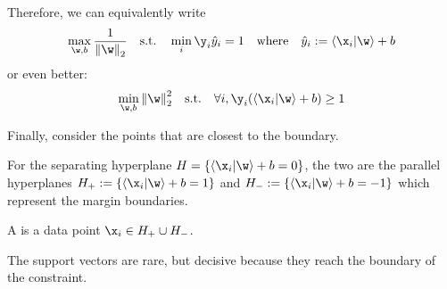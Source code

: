 \documentclass[class=cs480,notes,tikz]{agony}
\begin{document}
Therefore, we can equivalently write
\[ \max_{\w,b} \frac{1}{\norm{\w}_2} \qq{s.t.} \min_i \y_i \hat y_i = 1 \qq{where} \hat y_i := \ip{\x_i}{\w} + b \]
or even better:
\begin{equation}\label{eq:hsvm}
  \min_{\w,b} \norm{\w}_2^2 \qq{s.t.} \forall i,\y_i(\ip{\x_i}{\w} + b) \geq 1
\end{equation}

Finally, consider the points that are closest to the boundary.
\begin{defn*}
  For the separating hyperplane $H = \{\ip{\x_i}{\w}+b = 0\}$,
  the two  are the parallel hyperplanes
  $H_+ := \{\ip{\x_i}{\w}+b = 1\}$ and $H_- := \{\ip{\x_i}{\w}+b = -1\}$
  which represent the margin boundaries.

  A  is a data point $\x_i \in H_+ \cup H_-$.
\end{defn*}
The support vectors are rare, but decisive because they reach the boundary of the constraint.
\end{document}
